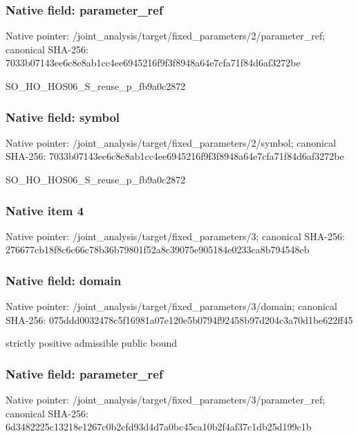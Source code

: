 \documentclass[10pt,a4paper]{article}
\begin{document}
\subsubsection{Native field: parameter\_\allowbreak{}ref}
Native pointer: /joint\_\allowbreak{}analysis/target/fixed\_\allowbreak{}parameters/2/parameter\_\allowbreak{}ref; canonical SHA-256: 7033b07143ee6c8e8ab1cc4ee6945216f9f3f8948a64e7cfa71f84d6af3272be

\begingroup\raggedright\sloppy SO\_\allowbreak{}HO\_\allowbreak{}HOS06\_\allowbreak{}S\_\allowbreak{}reuse\_\allowbreak{}p\_\allowbreak{}fb9a0c2872\par\endgroup

\subsubsection{Native field: symbol}
Native pointer: /joint\_\allowbreak{}analysis/target/fixed\_\allowbreak{}parameters/2/symbol; canonical SHA-256: 7033b07143ee6c8e8ab1cc4ee6945216f9f3f8948a64e7cfa71f84d6af3272be

\begingroup\raggedright\sloppy SO\_\allowbreak{}HO\_\allowbreak{}HOS06\_\allowbreak{}S\_\allowbreak{}reuse\_\allowbreak{}p\_\allowbreak{}fb9a0c2872\par\endgroup

\subsubsection{Native item 4}
Native pointer: /joint\_\allowbreak{}analysis/target/fixed\_\allowbreak{}parameters/3; canonical SHA-256: 276677cb18f8c6c66c78b36b79801f52a8c39075e905184e0233ca8b794548eb

\subsubsection{Native field: domain}
Native pointer: /joint\_\allowbreak{}analysis/target/fixed\_\allowbreak{}parameters/3/domain; canonical SHA-256: 075ddd0032478c5f16981a07e120e5b0794f92458b97d204c3a70d1be622ff45

\begingroup\raggedright\sloppy strictly positive admissible public bound\par\endgroup

\subsubsection{Native field: parameter\_\allowbreak{}ref}
Native pointer: /joint\_\allowbreak{}analysis/target/fixed\_\allowbreak{}parameters/3/parameter\_\allowbreak{}ref; canonical SHA-256: 6d3482225c13218e1267c0b2cfd93d4d7a0bc45ca10b2f4af37c1db25d199c1b
\end{document}
